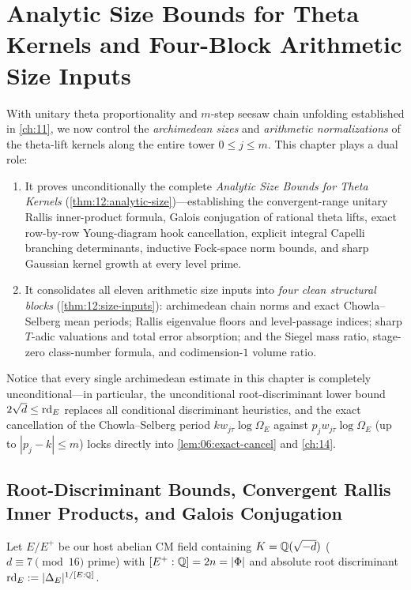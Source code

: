\chapter{Analytic Size Bounds for Theta Kernels and Four-Block Arithmetic Size Inputs}
\label{ch:12}

With unitary theta proportionality and $m$-step seesaw chain unfolding established in \cref{ch:11}, we now control the \emph{archimedean sizes} and \emph{arithmetic normalizations} of the theta-lift kernels along the entire tower $0 \le j \le m$. This chapter plays a dual role:
\begin{enumerate}[label=(\roman*)]
\item It proves unconditionally the complete \emph{Analytic Size Bounds for Theta Kernels} (\cref{thm:12:analytic-size})—establishing the convergent-range unitary Rallis inner-product formula, Galois conjugation of rational theta lifts, exact row-by-row Young-diagram hook cancellation, explicit integral Capelli branching determinants, inductive Fock-space norm bounds, and sharp Gaussian kernel growth at every level prime.
\item It consolidates all eleven arithmetic size inputs into \emph{four clean structural blocks} (\cref{thm:12:size-inputs}): archimedean chain norms and exact Chowla--Selberg mean periods; Rallis eigenvalue floors and level-passage indices; sharp $T$-adic valuations and total error absorption; and the Siegel mass ratio, stage-zero class-number formula, and codimension-$1$ volume ratio.
\end{enumerate}

Notice that every single archimedean estimate in this chapter is completely unconditional—in particular, the unconditional root-discriminant lower bound $2\sqrt{d} \le \mathrm{rd}_E$ replaces all conditional discriminant heuristics, and the exact cancellation of the Chowla--Selberg period $k w_{j\tau}\log\Omega_E$ against $p_j w_{j\tau}\log\Omega_E$ (up to $|p_j - k| \le m$) locks directly into \cref{lem:06:exact-cancel} and \cref{ch:14}.

\section{Root-Discriminant Bounds, Convergent Rallis Inner Products, and Galois Conjugation}
\label{sec:12:rallis-galois}

Let $E / E^+$ be our host abelian CM field containing $K = \mathbb{Q}(\sqrt{-d})$ ($d \equiv 7 \pmod{16}$ prime) with $[E^+ : \mathbb{Q}] = 2n = |\Phi|$ and absolute root discriminant $\mathrm{rd}_E := |\Delta_E|^{1/[E:\mathbb{Q}]}$.

